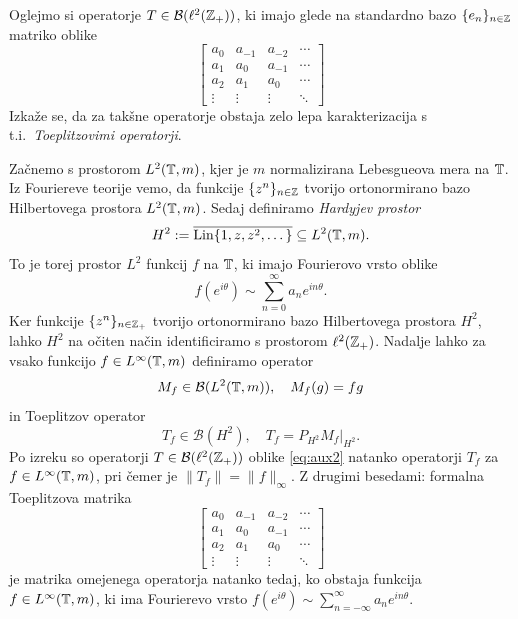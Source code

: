 \begin{zgled}\label{zgl:2.3}
    Oglejmo si operatorje $T \in \mathcal{B}(\ell^2 (\mathbb Z_+))$, ki imajo glede na standardno bazo $\{e_n\}_{n \in \mathbb Z}$ matriko oblike 
    \begin{equation}\label{eq:aux2}
        \begin{bmatrix}
        a_0 & a_{-1} & a_{-2} & \cdots \\
        a_{1} & a_0 & a_{-1} & \cdots \\
        a_{2} & a_1 & a_0 & \cdots \\
        \vdots & \vdots & \vdots & \ddots
    \end{bmatrix}\end{equation}
    Izkaže se, da za takšne operatorje obstaja zelo lepa karakterizacija s t.i.~\emph{Toeplitzovimi operatorji}.

    Začnemo s prostorom $L^2 (\mathbb T, m)$, kjer je $m$ normalizirana Lebesgueova mera na $\mathbb T$.
    Iz Fouriereve teorije vemo, da funkcije $\{z^n\}_{n \in \mathbb Z}$ tvorijo ortonormirano bazo Hilbertovega prostora $L^2 (\mathbb T, m)$.
    Sedaj definiramo \emph{Hardyjev prostor} $$H^2 := \overline{\operatorname{Lin}\{1, z, z^2, \dots\}} \subseteq L^2 (\mathbb T, m).$$
    To je torej prostor $L^2$ funkcij $f$ na $\mathbb T$, ki imajo Fourierovo vrsto oblike 
    $$f(e^{i\theta}) \sim \sum_{n = 0} ^\infty a_n e^{i n \theta}.$$
    Ker funkcije $\{z^n\}_{n \in \mathbb Z_+}$ tvorijo ortonormirano bazo Hilbertovega prostora $H^2$,
    lahko $H^2$ na očiten način identificiramo s prostorom $\ell^2 (\mathbb Z_+)$. Nadalje lahko za vsako funkcijo $f \in L^\infty (\mathbb T, m)$
    definiramo operator 
    $$M_f \in \mathcal{B}(L^2 (\mathbb T, m)),\quad M_f (g) = fg$$
    in Toeplitzov operator 
    $$T_f \in \mathcal{B} (H^2),\quad T_f = P_{H^2} M_f |_{H^2}.$$
    Po izreku \cite[Theorem 4.2.4, str. 108]{arveson2002} so operatorji $T \in \mathcal{B}(\ell^2 (\mathbb Z_+))$ oblike \eqref{eq:aux2}
    natanko operatorji $T_f$ za $f \in L^\infty (\mathbb T, m)$, pri čemer je $\| T_f \| = \| f\|_\infty$.
    Z drugimi besedami: formalna Toeplitzova matrika 
    $$\begin{bmatrix}
        a_0 & a_{-1} & a_{-2} & \cdots \\
        a_{1} & a_0 & a_{-1} & \cdots \\
        a_{2} & a_1 & a_0 & \cdots \\
        \vdots & \vdots & \vdots & \ddots
    \end{bmatrix}$$
    je matrika omejenega operatorja natanko tedaj, ko obstaja funkcija $f \in L^\infty (\mathbb T, m)$,
    ki ima Fourierevo vrsto $f(e^{i\theta}) \sim \sum_{n = -\infty} ^\infty a_n e^{i n \theta}$.


\end{zgled}
